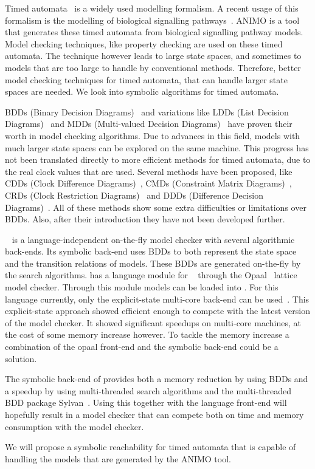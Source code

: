 Timed automata~\cite{Alur1994183} is a widely used modelling formalism. A recent usage of this formalism is the modelling of biological signalling pathways~\cite{SchivoSWCVKLPP12}. ANIMO is a tool that generates these timed automata from biological signalling pathway models. Model checking techniques, like property checking are used on these timed automata. The technique however leads to large state spaces, and sometimes to models that are too large to handle by conventional methods. Therefore, better model checking techniques for timed automata, that can handle larger state spaces are needed. We look into symbolic algorithms for timed automata.

BDDs (Binary Decision Diagrams)~\cite{Akers:1978:BDD:1310167.1310815,1676819} and variations like LDDs (List Decision Diagrams)~\cite{so62465} and MDDs (Multi-valued Decision Diagrams)~\cite{129849} have proven their worth in model checking algorithms. Due to advances in this field, models with much larger state spaces can be explored on the same machine. This progress has not been translated directly to more efficient methods for timed automata, due to the real clock values that are used. Several methods have been proposed, like CDDs (Clock Difference Diagrams)~\cite{BRICS19491}, CMDs (Constraint Matrix Diagrams)~\cite{5702245}, CRDs (Clock Restriction Diagrams)~\cite{crds} and DDDs (Difference Decision Diagrams)~\cite{ddds, ddd-datastructure-99}. All of these methods show some extra difficulties or limitations over BDDs. Also, after their introduction they have not been developed further.

\ltsmin{}~\cite{eemcs18152,ltsmin-mc:nmf2011} is a language-independent on-the-fly model checker with several algorithmic back-ends. Its symbolic back-end uses BDDs to both represent the state space and the transition relations of models. These BDDs are generated on-the-fly by the search algorithms. \ltsmin{} has a language module for \uppaal{}~\cite{UPPAAL} through the Opaal~\cite{opaal} lattice model checker. Through this module \uppaal{} models can be loaded into \ltsmin{}. For this language currently, only the explicit-state multi-core back-end can be used~\cite{eemcs21972}. This explicit-state approach showed efficient enough to compete with the latest version of the \uppaal{} model checker. It showed significant speedups on multi-core machines, at the cost of some memory increase however. To tackle the memory increase a combination of the opaal front-end and the symbolic back-end could be a solution.

The symbolic back-end of \ltsmin{} provides both a memory reduction by using BDDs and a speedup by using multi-threaded search algorithms and the multi-threaded BDD package Sylvan~\cite{sylvan}. Using this together with the \uppaal{} language front-end will hopefully result in a model checker that can compete both on time and memory consumption with the \uppaal{} model checker.

We will propose a symbolic reachability for timed automata that is capable of handling the models that are generated by the ANIMO tool.